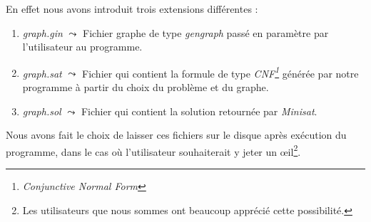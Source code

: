   En effet nous avons introduit trois extensions différentes :
  \begin{enumerate}
   \item \emph{graph.gin} $\leadsto$ Fichier graphe de type
	 \emph{gengraph} passé en paramètre par l'utilisateur au
	 programme.
   \item \emph{graph.sat} $\leadsto$ Fichier qui contient la formule de
	 type \emph{CNF\footnote{\emph{Conjunctive Normal Form}}}
	 générée par notre programme à partir du choix du problème et du
	 graphe.
   \item \emph{graph.sol} $\leadsto$ Fichier qui contient la solution
	 retournée par \emph{Minisat}.
  \end{enumerate}

  Nous avons fait le choix de laisser ces fichiers sur le disque après
  exécution du programme, dans le cas où l'utilisateur souhaiterait y
  jeter un \oe{}il\footnote{Les utilisateurs que nous sommes ont
  beaucoup apprécié cette possibilité.}.
